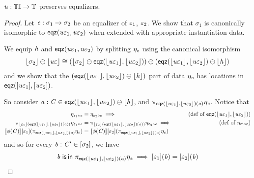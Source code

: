 \begin{lemma}\label{lem:tinstU-eq-pres}
    $\mathit{u} : {\mathbb{T}\mathbb{I}} \to \mathbb{T}$ preserves equalizers. 
\end{lemma}
\begin{proof}
    Let $\mathit{e} : \sigma_1 \to \sigma_2$ be an equalizer of $\varepsilon_1$, $\varepsilon_2$.
    We show that $\sigma_1$ is canonically isomorphic to $\mathsf{eqz}(\mathit{u}{\varepsilon_1}, \mathit{u}{\varepsilon_2})$ when extended with appropriate instantiation data.

    \begin{center}
    \end{center}
    We equip $\mathit{h}$ and $\mathsf{eqz}(\mathit{u}\varepsilon_1, \mathit{u}\varepsilon_2)$ by splitting $\eta_{\mathit{e}}$ using the canonical isomorphism
    \[ \lfloor\sigma_2\rfloor \ominus \lfloor\mathit{u}\varepsilon\rfloor \cong (\lfloor\sigma_2\rfloor \ominus \mathsf{eqz}(\lfloor\mathit{u}\varepsilon_1\rfloor, \lfloor\mathit{u}\varepsilon_2\rfloor)) \oplus
                                                        (\mathsf{eqz}(\lfloor\mathit{u}\varepsilon_1\rfloor, \lfloor\mathit{u}\varepsilon_2\rfloor) \ominus \lfloor\mathit{h}\rfloor) \]
    and we show that the $(\mathsf{eqz}(\lfloor\mathit{u}\varepsilon_1\rfloor, \lfloor\mathit{u}\varepsilon_2\rfloor) \ominus \lfloor\mathit{h}\rfloor)$ part of data $\eta_{\mathit{e}}$ has locations in $\mathsf{eqz}([\mathit{u}\varepsilon_1], [\mathit{u}\varepsilon_2])$.

    So consider $\mathit{a} : \mathit{C} \in \mathsf{eqz}(\lfloor\mathit{u}\varepsilon_1\rfloor, \lfloor\mathit{u}\varepsilon_2\rfloor) \ominus \lfloor\mathit{h}\rfloor$, and $\pi_{\mathsf{eqz}(\lfloor\mathit{u}\varepsilon_1\rfloor, \lfloor\mathit{u}\varepsilon_2\rfloor)(\mathit{a})} \eta_{\mathit{e}}$. 
    Notice that
    \begin{align*}
        \mvarM_{\me_1 \comp \ve} &= \mvarM_{\me_2 \comp \ve} \implies  & \tag{def of $\eqz{\concL{\tinstU\me_1}}{\concL{\tinstU\me_2}}$} \\
        \pi_{\concL{\me_1}(\eqz{\concL{\tinstU\me_1}}{\concL{\tinstU\me_2}}(\va))} \mvarM_{\me_1 \comp \ve} & = 
        \pi_{\concL{\me_2}(\eqz{\concL{\tinstU\me_1}}{\concL{\tinstU\me_2}}(\va))} \mvarM_{\me_2 \comp \ve} \implies      & \tag{def of $\mvarM_{\me' \comp \me}$} \\
        \sem{\phi(\vC)}\anyL{\me_1}(\pi_{\eqz{\concL{\tinstU\me_1}}{\concL{\tinstU\me_2}}(\va)} \mvarM_\ve) & = 
        \sem{\phi(\vC)}\anyL{\me_2}(\pi_{\eqz{\concL{\tinstU\me_1}}{\concL{\tinstU\me_2}}(\va)} \mvarM_\ve)
    \end{align*}
    and so for every $\mathit{b} : \mathit{C}' \in [\sigma_2]$, we have 
    \[ \mathit{b} \;\mathsf{is}\,\mathsf{in}\; \pi_{\mathsf{eqz}(\lfloor\mathit{u}\varepsilon_1\rfloor, \lfloor\mathit{u}\varepsilon_2\rfloor)(\mathit{a})} \eta_{\mathit{e}} \implies [\varepsilon_1](\mathit{b}) = [\varepsilon_2](\mathit{b}) \]


\end{proof}
